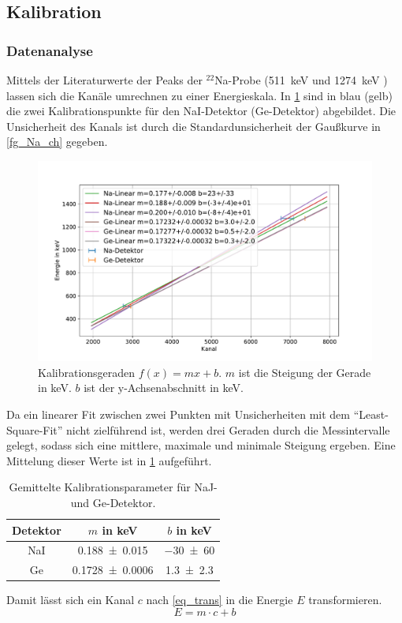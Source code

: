 \documentclass[
	a4paper,
	12pt,
	pagesize,
	ngerman
]{scrartcl}
\begin{document}
	\subsection{Kalibration}
	\subsubsection{Datenanalyse}
  Mittels der Literaturwerte der Peaks der $^{22}$Na-Probe (\SI{511}{keV} und \SI{1274}{keV} \cite{Anleitung}) lassen sich die Kanäle umrechnen zu einer Energieskala.  %
	In \cref{fg_kali_mix} sind in blau (gelb) die zwei Kalibrationspunkte für den NaI-Detektor (Ge-Detektor) abgebildet.
	Die Unsicherheit des Kanals ist durch die Standardunsicherheit der Gaußkurve in \cref{fg_Na_ch} gegeben.

	\begin{figure}[H]
			\includegraphics[width= 0.8 \linewidth]{img/kali_mix.pdf}
			\caption{
				Kalibrationsgeraden $f(x)=mx+b$.
				$m$ ist die Steigung der Gerade in \si{keV}.
				$b$ ist der y-Achsenabschnitt in \si{keV}.
			}
			\label{fg_kali_mix}
	\end{figure}

	Da ein linearer Fit zwischen zwei Punkten mit Unsicherheiten mit dem \enquote{Least-Square-Fit} nicht zielführend ist, werden drei Geraden durch die Messintervalle gelegt, sodass sich eine mittlere, maximale und minimale Steigung ergeben. %
	Eine Mittelung dieser Werte ist in \cref{tb_kali_avg} aufgeführt.

\begin{table}[H]
		\centering
		\begin{tabular}{c | c | c  }
			 Detektor& $m$ in \si{keV}& $b$ in \si{keV} \\ \hline
			 NaI & \SI{0.188+-0.015}{} & \SI{-30+-60}{} \\
			 Ge & \SI{0.1728+-0.0006}{} & \SI{1.3+-2.3}{} \\
		\end{tabular}
		\caption{
		Gemittelte Kalibrationsparameter für NaJ- und Ge-Detektor.
		}
		\label{tb_kali_avg}
\end{table}
Damit lässt sich ein Kanal $c$ nach \cref{eq_trans} in die Energie $E$ transformieren.
\begin{equation}
	\label{eq_trans}
	E = m\cdot c + b
\end{equation}
\end{document}
